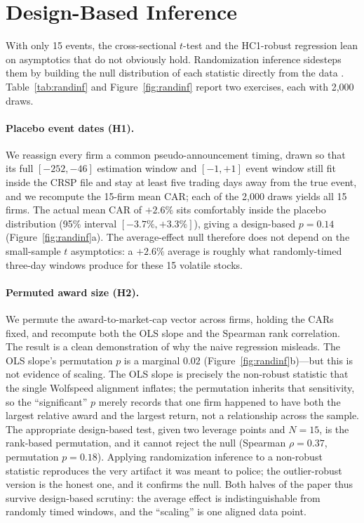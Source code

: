 \documentclass[12pt]{article}
\begin{document}
\section{Design-Based Inference}\label{sec:randinf}
With only 15 events, the cross-sectional $t$-test and the HC1-robust regression lean on
asymptotics that do not obviously hold. Randomization inference sidesteps them by building the null
distribution of each statistic directly from the data \citep{young2019}. Table~\ref{tab:randinf}
and Figure~\ref{fig:randinf} report two exercises, each with 2{,}000 draws.

\paragraph{Placebo event dates (H1).} We reassign every firm a common pseudo-announcement timing,
drawn so that its full $[-252,-46]$ estimation window and $[-1,+1]$ event window still fit inside
the CRSP file and stay at least five trading days away from the true event, and we recompute the
15-firm mean CAR; each of the 2{,}000 draws yields all 15 firms. The actual mean CAR of $+2.6\%$
sits comfortably inside the placebo distribution (95\% interval $[-3.7\%,+3.3\%]$), giving a
design-based $p=0.14$ (Figure~\ref{fig:randinf}a). The average-effect null therefore does not
depend on the small-sample $t$ asymptotics: a $+2.6\%$ average is roughly what randomly-timed
three-day windows produce for these 15 volatile stocks.

\paragraph{Permuted award size (H2).} We permute the award-to-market-cap vector across firms,
holding the CARs fixed, and recompute both the OLS slope and the Spearman rank correlation. The
result is a clean demonstration of why the naive regression misleads. The OLS slope's permutation
$p$ is a marginal $0.02$ (Figure~\ref{fig:randinf}b)---but this is not evidence of scaling. The OLS
slope is precisely the non-robust statistic that the single Wolfspeed alignment inflates; the
permutation inherits that sensitivity, so the ``significant'' $p$ merely records that one firm
happened to have both the largest relative award and the largest return, not a relationship across
the sample. The appropriate design-based test, given two leverage points and $N=15$, is the
rank-based permutation, and it cannot reject the null (Spearman $\rho=0.37$, permutation $p=0.18$).
Applying randomization inference to a non-robust statistic reproduces the very artifact it was meant
to police; the outlier-robust version is the honest one, and it confirms the null. Both halves of
the paper thus survive design-based scrutiny: the average effect is indistinguishable from randomly
timed windows, and the ``scaling'' is one aligned data point.
\end{document}
